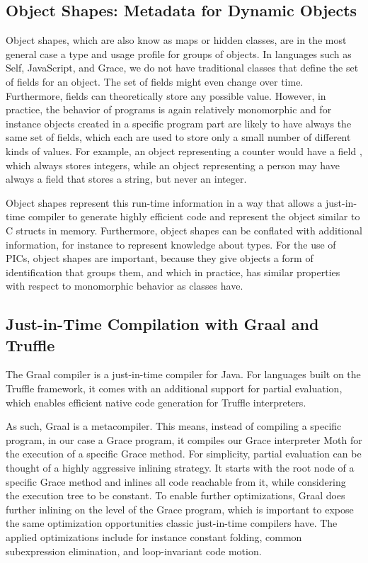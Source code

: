 \subsection{Object Shapes: Metadata for Dynamic Objects}
\label{sec:background-obj-shape}

Object shapes\citep{woss2014object},
which are also know as maps\citep{Self} or hidden classes,
are in the most general case a type and usage profile for groups of objects.
In languages such as Self, JavaScript, and Grace,
we do not have traditional classes that define the set of fields for an object.
The set of fields might even change over time.
Furthermore, fields can theoretically store any possible value.
However, in practice, the behavior of programs is again relatively monomorphic
and for instance objects created in a specific program part are likely
to have always the same set of fields, which each are used to store only
a small number of different kinds of values.
For example, an object representing a counter would have a field ,
which always stores integers,
while an object representing a person may have always a field 
that stores a string, but never an integer.

Object shapes represent this run-time information in a way that allows a
just-in-time compiler to generate highly efficient code and represent
the object similar to C structs in memory.
Furthermore, object shapes can be conflated with additional information,
for instance to represent knowledge about types\citep{Bauman2017,Richards2017}.
For the use of PICs, object shapes are important,
because they give objects a form of identification that groups them,
and which in practice, has similar properties with respect to monomorphic
behavior as classes have.

\subsection{Just-in-Time Compilation with Graal and Truffle}
\label{sec:background-graal-pe}

The Graal compiler is a just-in-time compiler for Java.
For languages built on the Truffle framework,
it comes with an additional support for partial evaluation,
which enables efficient native code generation for
Truffle interpreters\citep{Wurthinger:2017:PPE}.

As such, Graal is a metacompiler.
This means, instead of compiling a specific program, in our case a Grace program,
it compiles our Grace interpreter Moth for the execution of a specific Grace method.
For simplicity, partial evaluation can be thought of a highly aggressive inlining strategy.
It starts with the root node of a specific Grace method
and inlines all code reachable from it, while considering the execution tree
to be constant.
To enable further optimizations,
Graal does further inlining on the level of the Grace program,
which is important to expose the same optimization opportunities
classic just-in-time compilers have.
The applied optimizations include for instance
constant folding, common subexpression elimination, and loop-invariant code motion.


